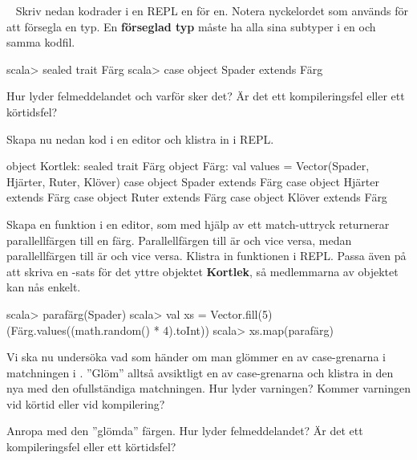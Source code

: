 \QUESTEND








\QUESTBEGIN

\Task	\label{task:match-sealedtrait} \what~	Skriv nedan kodrader i en REPL en för en. Notera nyckelordet  som används för att försegla en typ. En \textbf{förseglad typ} måste ha alla sina subtyper i en och samma kodfil.
\begin{REPL}
scala> sealed trait Färg
scala> case object Spader extends Färg
\end{REPL}
\Subtask Hur lyder felmeddelandet och varför sker det? Är det ett kompileringsfel eller ett körtidsfel?

\Subtask  \label{subtask:match-sealedtrait-caseobject}
Skapa nu nedan kod i en editor och klistra in i REPL.
\begin{Code}
object Kortlek:
  sealed trait Färg
  object Färg:
      val values = Vector(Spader, Hjärter, Ruter, Klöver)
  case object Spader extends Färg
  case object Hjärter extends Färg
  case object Ruter extends Färg
  case object Klöver extends Färg
\end{Code}

\Subtask \label{subtask:match-sealedtrait-function}
Skapa en funktion  i en editor, som med hjälp av ett match-uttryck returnerar parallellfärgen till en färg. Parallellfärgen till  är  och vice versa, medan parallellfärgen till  är  och vice versa. Klistra in funktionen i REPL. Passa även på att skriva en -sats för det yttre objektet \textbf{Kortlek}, så medlemmarna av objektet kan nås enkelt.
\begin{REPL}
scala> parafärg(Spader)
scala> val xs = Vector.fill(5)(Färg.values((math.random() * 4).toInt))
scala> xs.map(parafärg)
\end{REPL}

\Subtask \label{subtask:match-forgetcase}
Vi ska nu undersöka vad som händer om man glömmer en av case-grenarna i matchningen i . ''Glöm'' alltså avsiktligt en av case-grenarna och klistra in den nya  med den ofullständiga matchningen. Hur lyder varningen? Kommer varningen vid körtid eller vid kompilering?

\Subtask Anropa  med den ''glömda'' färgen. Hur lyder felmeddelandet? Är det ett kompileringsfel eller ett körtidsfel?

